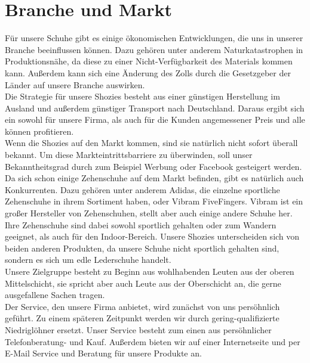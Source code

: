 \chapter{Branche und Markt}
\label{cha:4}
Für unsere Schuhe gibt es einige ökonomischen Entwicklungen, die uns in unserer Branche beeinflussen können. Dazu gehören unter anderem Naturkatastrophen in Produktionsnähe, da diese zu einer Nicht-Verfügbarkeit des Materials kommen kann. Außerdem kann sich eine Änderung des Zolls durch die Gesetzgeber der Länder auf unsere Branche auswirken.\\
Die Strategie für unsere Shozies besteht aus einer günstigen Herstellung im Ausland und außerdem günstiger Transport nach Deutschland. Daraus ergibt sich ein sowohl für unsere Firma, als auch für die Kunden angemessener Preis und alle können profitieren.\\
Wenn die Shozies auf den Markt kommen, sind sie natürlich nicht sofort überall bekannt. Um diese Markteintrittsbarriere zu überwinden, soll unser Bekanntheitsgrad durch zum Beispiel Werbung oder Facebook gesteigert werden.\\
Da sich schon einige Zehenschuhe auf dem Markt befinden, gibt es natürlich auch Konkurrenten. Dazu gehören unter anderem \glqq Adidas\grqq , die einzelne sportliche Zehenschuhe in ihrem Sortiment haben, oder \glqq Vibram FiveFingers\grqq . Vibram ist ein großer Hersteller von Zehenschuhen, stellt aber auch einige andere Schuhe her. Ihre Zehenschuhe sind dabei sowohl sportlich gehalten oder zum Wandern geeignet, als auch für den Indoor-Bereich. Unsere Shozies unterscheiden sich von beiden anderen Produkten, da unsere Schuhe nicht sportlich gehalten sind, sondern es sich um edle Lederschuhe handelt.\\
Unsere Zielgruppe besteht zu Beginn aus wohlhabenden Leuten aus der oberen Mittelschicht, sie spricht aber auch Leute aus der Oberschicht an, die gerne ausgefallene Sachen tragen.\\
Der Service, den unsere Firma anbietet, wird zunächst von uns persöhnlich geführt. Zu einem späteren Zeitpunkt werden wir durch gering-qualifizierte Niedriglöhner ersetzt. Unser Service besteht zum einen aus persöhnlicher Telefonberatung- und Kauf. Außerdem bieten wir auf einer Internetseite und per E-Mail Service und Beratung für unsere Produkte an.
